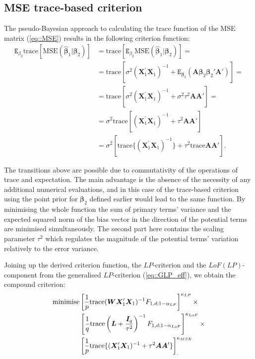 \subsection{MSE trace-based criterion}
\label{sec::msel}
The pseudo-Bayesian approach to calculating the trace function of the MSE matrix (\ref{eq::MSE}) results in the following criterion function: 
\begin{align*}
\mathtt{E}_{\beta_2}\mbox{trace}[\mbox{MSE}(\bm{\hat{\beta}}_1|\bm{\beta}_2)]&=\mbox{trace}[\mathtt{E}_{\beta_2}\mbox{MSE}(\bm{\hat{\beta}}_1|\bm{\beta}_2)]=\\&=\mbox{trace}[\sigma^2(\bm{X}_1^{'}\bm{X}_1)^{-1} + \mathtt{E}_{\bm{\beta}_2}(\bm{A}\bm{\beta}_2\bm{\beta}_2'\bm{A}')]=\\&=\mbox{trace}[\sigma^2(\bm{X}_1^{'}\bm{X}_1)^{-1}+\sigma^2\tau^2\bm{A}\bm{A}']=\\&=\sigma^2\mbox{trace}[(\bm{X}_1^{'}\bm{X}_1)^{-1}+\tau^2\bm{A}\bm{A}']\\&=\sigma^2[\mbox{trace}\{(\bm{X}_1^{'}\bm{X}_1)^{-1}\}+\tau^2\mbox{trace}\bm{A}\bm{A}'].
\end{align*}

The transitions above are possible due to commutativity of the operations of trace and expectation. The main advantage is the absence of the necessity of any additional numerical evaluations, and in this case of the trace-based criterion using the point prior for $\bm{\beta}_2$ defined earlier would lead to the same function. By minimising the whole function the sum of primary terms' variance and the expected squared norm of the bias vector in the direction of the potential terms are minimised simultaneously. The second part here contains the scaling parameter $\tau^2$ which regulates the magnitude of the potential terms' variation relatively to the error variance. 

Joining up the derived criterion function, the $LP$-criterion and the $LoF(LP)$-component from the generalised $LP$-criterion (\ref{eq::GLP_eff}), we obtain the compound criterion:
\begin{align}
\label{eq::MSE_L}
\mbox{minimise} &\left[\frac{1}{p}\mbox{trace}(\bm{WX}'_{1}\bm{X}_{1})^{-1}F_{1,d;1-\alpha_{LP}}\right]^{\kappa_{LP}}\times \notag\\& \left[\frac{1}{q}\mbox{trace}\left(\bm{L}+\frac{\bm{I}_{q}}{\tau^{2}}\right)^{-1}F_{1,d;1-\alpha_{LoF}}\right]^{\kappa_{LoF}}\times 
\notag\\& \left[\frac{1}{p}\mbox{trace}\{(\bm{X}'_{1}\bm{X}_{1})^{-1}+\tau^2\bm{A}\bm{A}'\}\right]^{\kappa_{MSE}}_{.}
\end{align}
